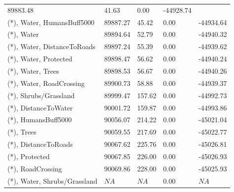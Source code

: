 \documentclass[abstract=on,10pt,a4paper,bibliography=totocnumbered]{scrartcl}
\begin{document}
\begin{table}[h]
\begin{center}
{\begin{tabular}{lllll}
        89883.48 &
          41.63 &
            0.00 &
              -44928.74 \\
      (*), Water, HumansBuff5000 &
        89887.27 &
          45.42 &
            0.00 &
              -44934.64 \\
      (*), Water &
        89894.64 &
          52.79 &
            0.00 &
              -44940.32 \\
      (*), Water, DistanceToRoads &
        89897.24 &
          55.39 &
            0.00 &
              -44939.62 \\
      (*), Water, Protected &
        89898.47 &
          56.62 &
            0.00 &
              -44940.24 \\
      (*), Water, Trees &
        89898.53 &
          56.67 &
            0.00 &
              -44940.26 \\
      (*), Water, RoadCrossing &
        89900.73 &
          58.88 &
            0.00 &
              -44939.37 \\
      (*), Shrubs/Grassland &
        89999.47 &
          157.62 &
            0.00 &
              -44992.73 \\
      (*), DistanceToWater &
        90001.72 &
          159.87 &
            0.00 &
              -44993.86 \\
      (*), HumansBuff5000 &
        90056.07 &
          214.22 &
            0.00 &
              -45021.04 \\
      (*), Trees &
        90059.55 &
          217.69 &
            0.00 &
              -45022.77 \\
      (*), DistanceToRoads &
        90067.62 &
          225.76 &
            0.00 &
              -45026.81 \\
      (*), Protected &
        90067.85 &
          226.00 &
            0.00 &
              -45026.93 \\
      (*), RoadCrossing &
        90069.86 &
          228.00 &
            0.00 &
              -45025.93 \\
      (*), Water, Shrubs/Grassland &
        \(NA\) &
          \(NA\) &
            0.00 &
              \(NA\) \\
      \bottomrule
      \end{tabular}
    }
  \end{center}
\end{table}

\newpage
\end{document}
